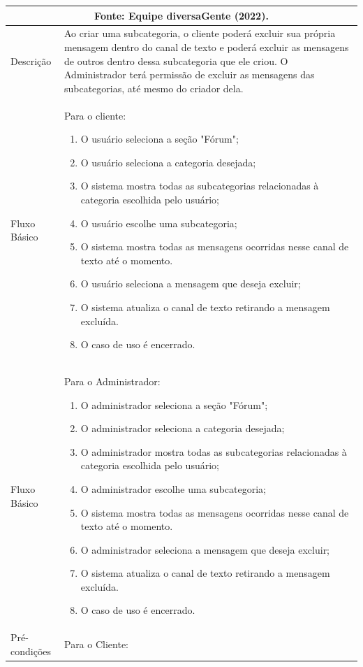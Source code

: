 \begin{apendicesenv}
\begin{longtable}{|p{3.3cm}|p{12.3cm}|}
		\endfirsthead
		\multicolumn{2}{c}{\scriptsize Fonte: Equipe diversaGente (2022).}%
		{{ \autoref{casos-de-uso5} continued from previous page}} \\
		\endhead
		
		Descrição & Ao criar uma subcategoria, o cliente poderá excluir sua própria mensagem dentro do canal de texto e poderá excluir as mensagens de outros dentro dessa subcategoria que ele criou. O Administrador terá permissão de excluir as mensagens das subcategorias, até mesmo do criador dela.\\
		\hline
		Fluxo Básico  & 
		Para o cliente:
		\begin{enumerate}
			\item O usuário seleciona a seção "Fórum";
			\item O usuário seleciona a categoria desejada;
			\item O sistema mostra todas as subcategorias relacionadas à categoria escolhida pelo usuário;
			\item O usuário escolhe uma subcategoria;
			\item O sistema mostra todas as mensagens ocorridas nesse canal de texto até o momento. 
			\item O usuário seleciona a mensagem que deseja excluir;
			\item O sistema atualiza o canal de texto retirando a mensagem excluída. 
			\item O  caso de uso é encerrado. 
		\end{enumerate}\\
		\hline
		Fluxo Básico  & 
		Para o Administrador:
		\begin{enumerate}
			\item O administrador seleciona a seção "Fórum";
			\item O administrador seleciona a categoria desejada;
			\item O administrador mostra todas as subcategorias relacionadas à categoria escolhida pelo usuário;
			\item O administrador escolhe uma subcategoria;
			\item O sistema mostra todas as mensagens ocorridas nesse canal de texto até o momento. 
			\item O administrador seleciona a mensagem que deseja excluir;
			\item O sistema atualiza o canal de texto retirando a mensagem excluída. 
			\item O caso de uso é encerrado. 
		\end{enumerate}\\
		\hline
		Pré-condições & Para o Cliente: 
		

\end{longtable}
\end{apendicesenv}
